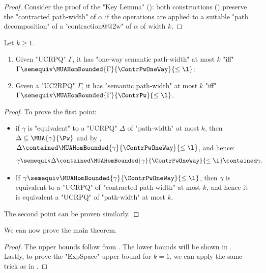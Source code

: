 \begin{proof}
	Consider the proof of the "Key Lemma" ():
	both constructions () preserve the "contracted path-width" of $\alpha$ if the operations are applied
	to a suitable "path decomposition" of a "contraction@@2w" of $\alpha$ of width $k$.
\end{proof}

\begin{lemma}
	\AP\label{lemma:characterisation-bounded-semantic-pw}
	Let $k \geq 1$.
	\begin{enumerate}
		\item Given "UCRPQ" $\Gamma$, it has "one-way semantic path-width" at most $k$
			"iff" $\Gamma \semequiv \MUAHomBounded{\Gamma}{\ContrPwOneWay}{\leq\l}$;
		\item Given a "UC2RPQ" $\Gamma$, it has "semantic path-width" at most $k$
			"iff" $\Gamma \semequiv \MUAHomBounded{\Gamma}{\ContrPw}{\leq\l}$.
	\end{enumerate}
\end{lemma}

\begin{proof}
	To prove the first point:
	\begin{itemize}
		\item if $\gamma$ is "equivalent" to a "UCRPQ" $\Delta$ of "path-width" at most $k$, then
			$\Delta \subseteq \MUA{\gamma}{\Pw}$ and by ,
			$\Delta \contained \MUAHomBounded{\gamma}{\ContrPwOneWay}{\leq\l}$,
			and hence:
			\[
				\gamma \semequiv \Delta
				\contained \MUAHomBounded{\gamma}{\ContrPwOneWay}{\leq\l}
				\contained \gamma.
			\]
		\item If $\gamma \semequiv \MUAHomBounded{\gamma}{\ContrPwOneWay}{\leq\l}$, 
			then $\gamma$ is equivalent to a "UCRPQ" of "contracted path-width" at
			most $k$, and hence it is equivalent a "UCRPQ" of "path-width" at most $k$. 
	\end{itemize}
	The second point can be proven similarly.
\end{proof}

We can now prove the main theorem.
\decidabilitySemPw

\begin{proof}
	The upper bounds follow from .
	The lower bounds will be shown in . Lastly, to prove the "ExpSpace" upper bound
	for $k=1$, we can apply the same trick as in .
\end{proof}

